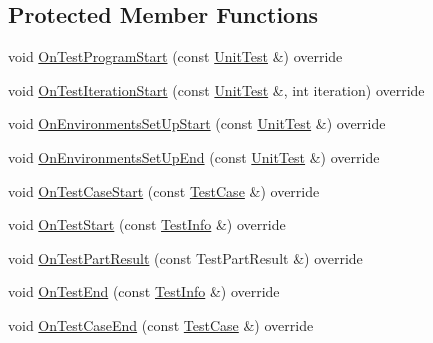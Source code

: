 \subsection*{Protected Member Functions}
\begin{DoxyCompactItemize}
\item 
void \mbox{\hyperlink{classtesting_1_1internal_1_1_event_recording_listener_a9cec5ac263fe161de360615422370eec}{On\+Test\+Program\+Start}} (const \mbox{\hyperlink{classtesting_1_1_unit_test}{Unit\+Test}} \&) override
\item 
void \mbox{\hyperlink{classtesting_1_1internal_1_1_event_recording_listener_aeed7e9302e3fc2c182a2f20c174d62b8}{On\+Test\+Iteration\+Start}} (const \mbox{\hyperlink{classtesting_1_1_unit_test}{Unit\+Test}} \&, int iteration) override
\item 
void \mbox{\hyperlink{classtesting_1_1internal_1_1_event_recording_listener_ae192e9289f576fc770b549a575d8e786}{On\+Environments\+Set\+Up\+Start}} (const \mbox{\hyperlink{classtesting_1_1_unit_test}{Unit\+Test}} \&) override
\item 
void \mbox{\hyperlink{classtesting_1_1internal_1_1_event_recording_listener_ada752f5c75723828ed8661c513edbd10}{On\+Environments\+Set\+Up\+End}} (const \mbox{\hyperlink{classtesting_1_1_unit_test}{Unit\+Test}} \&) override
\item 
void \mbox{\hyperlink{classtesting_1_1internal_1_1_event_recording_listener_a3ce90fda790857eb64444038a5b3258f}{On\+Test\+Case\+Start}} (const \mbox{\hyperlink{classtesting_1_1_test_case}{Test\+Case}} \&) override
\item 
void \mbox{\hyperlink{classtesting_1_1internal_1_1_event_recording_listener_ad850af9e4276b9bfba61435b97a02094}{On\+Test\+Start}} (const \mbox{\hyperlink{classtesting_1_1_test_info}{Test\+Info}} \&) override
\item 
void \mbox{\hyperlink{classtesting_1_1internal_1_1_event_recording_listener_a9122b67d43420a41d1cfe9307809e078}{On\+Test\+Part\+Result}} (const Test\+Part\+Result \&) override
\item 
void \mbox{\hyperlink{classtesting_1_1internal_1_1_event_recording_listener_ab374bf69a73cd7dd8fcef5aea1209728}{On\+Test\+End}} (const \mbox{\hyperlink{classtesting_1_1_test_info}{Test\+Info}} \&) override
\item 
void \mbox{\hyperlink{classtesting_1_1internal_1_1_event_recording_listener_a52788314427f5c7a4585ea0bf5f3c251}{On\+Test\+Case\+End}} (const \mbox{\hyperlink{classtesting_1_1_test_case}{Test\+Case}} \&) override
\item 

\end{DoxyCompactItemize}

